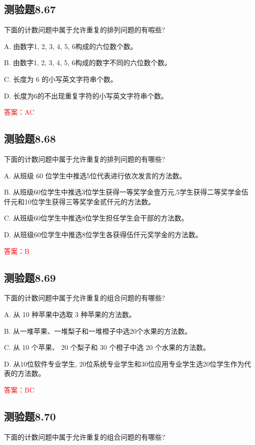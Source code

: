 \documentclass[UTF8, heading=true]{ctexart}
\begin{document}
\subsection{测验题8.67}

下面的计数问题中属于允许重复的排列问题的有㗇些?

A. 由数字1, 2, 3, 4, 5, 6构成的六位数个数。

B. 由数字1, 2, 3, 4, 5, 6构成的数字不同的六位数个数。

C. 长度为 6 的小写英文字符串个数。

D. 长度为6的不出现重复字符的小写英文字符串个数。

\textcolor{red}{答案：AC}


\subsection{测验题8.68}

下面的计数问题中属于允许重复的排列问题的有哪些?

A. 从班级 60 位学生中推选5位代表进行依次发言的方法数。

B. 从班级60位学生中推选3位学生获得一等奖学金壹万元,5学生获得二等奖学金伍仟元和10位学生获得三等奖学金贰仟元的方法数。

C. 从班级60位学生中推选8位学生担任学生会干部的方法数。

D. 从班级60位学生中推选8位学生各获得伍仟元奖学金的方法数。

\textcolor{red}{答案：B}

\subsection{测验题8.69}

下面的计数问题中属于允许重复的组合问题的有哪些?

A. 从 10 种苹果中选取 3 种苹果的方法数。

B. 从一堆苹果、一堆梨子和一堆橙子中选20个水果的方法数。

C. 从 10 个苹果、 20 个梨子和 30 个橙子中选 20 个水果的方法数。

D. 从10位软件专业学生, 20位系统专业学生和30位应用专业学生选20位学生作为代表的方法数。

\textcolor{red}{答案：BC}


\subsection{测验题8.70}

下面的计数问题中属于允许重复的组合问题的有哪些?
\end{document}
